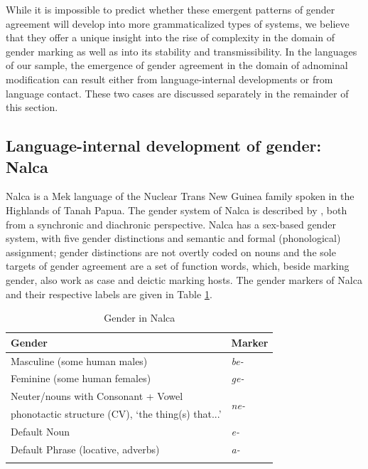 \documentclass[output=collectionpaper]{langsci/langscibook}
\begin{document}
While it is impossible to predict whether these emergent patterns of gender agreement will develop into more grammaticalized types of systems, we believe that they offer a unique insight into the rise of complexity in the domain of gender marking as well as into its stability and transmissibility. In the languages of our sample, the emergence of gender agreement in the domain of adnominal modification can result either from language-internal developments or from language contact. These two cases are discussed separately in the remainder of this section.

\subsection{Language-internal development of gender: Nalca}
Nalca is a Mek language of the Nuclear Trans New Guinea family spoken in the Highlands of Tanah Papua. The gender system of Nalca is described by \citet{Waelchli2018}, both from a synchronic and diachronic perspective. Nalca has a sex-based gender system, with five gender distinctions and semantic and formal (phonological) assignment; gender distinctions are not overtly coded on nouns and the sole targets of gender agreement are a set of function words, which, beside marking gender, also work as case and deictic marking hosts. The gender markers of Nalca and their respective labels are given in Table \ref{tab:4:Nalca}.

 \begin{table}
\caption{Gender in Nalca}
\label{tab:4:Nalca}
 \begin{tabular}{ll} %
  \lsptoprule
Gender   & Marker \\ %
  \midrule
Masculine (some human males) & \textit{be-}\\
Feminine (some human females) & \textit{ge-} \\
Neuter/nouns with Consonant + Vowel  & \multirow{2}{*}{\textit{ne-}} \\
\quad phonotactic structure (CV), `the thing(s) that...' & \\
Default Noun & \textit{e-}\\
Default Phrase (locative, adverbs) & \textit{a-}\\
  \lspbottomrule
 \end{tabular}
\end{table}
\end{document}
